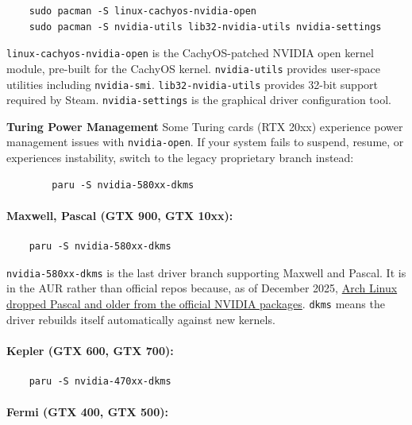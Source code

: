 \documentclass{article}
\newcommand{\code}[1]{\colorbox{codebg}{\texttt{#1}}}
\begin{document}
\begin{verbatim}
	sudo pacman -S linux-cachyos-nvidia-open
	sudo pacman -S nvidia-utils lib32-nvidia-utils nvidia-settings
\end{verbatim}

\noindent \code{linux-cachyos-nvidia-open} is the CachyOS-patched NVIDIA open kernel module,
pre-built for the CachyOS kernel. \code{nvidia-utils} provides user-space utilities
including \code{nvidia-smi}. \code{lib32-nvidia-utils} provides 32-bit support
required by Steam. \code{nvidia-settings} is the graphical driver configuration tool.

\begin{callout}{\textbf{Turing Power Management}}
	Some Turing cards (RTX 20xx) experience power management issues with
	\code{nvidia-open}. If your system fails to suspend, resume, or experiences
	instability, switch to the legacy proprietary branch instead:
	\begin{verbatim}
		paru -S nvidia-580xx-dkms
	\end{verbatim}
\end{callout}

\paragraph{Maxwell, Pascal (GTX 900, GTX 10xx):}

\begin{verbatim}
	paru -S nvidia-580xx-dkms
\end{verbatim}

\noindent \code{nvidia-580xx-dkms} is the last driver branch supporting Maxwell and Pascal.
It is in the AUR rather than official repos because, as of December 2025,
\href{https://archlinux.org/news/nvidia-590-driver-drops-pascal-support-main-packages-switch-to-open-kernel-modules/}{Arch
	Linux dropped Pascal and older from the official NVIDIA packages}. \code{dkms}
means the driver rebuilds itself automatically against new kernels.

\paragraph{Kepler (GTX 600, GTX 700):}

\begin{verbatim}
	paru -S nvidia-470xx-dkms
\end{verbatim}

\paragraph{Fermi (GTX 400, GTX 500):}
\end{document}
